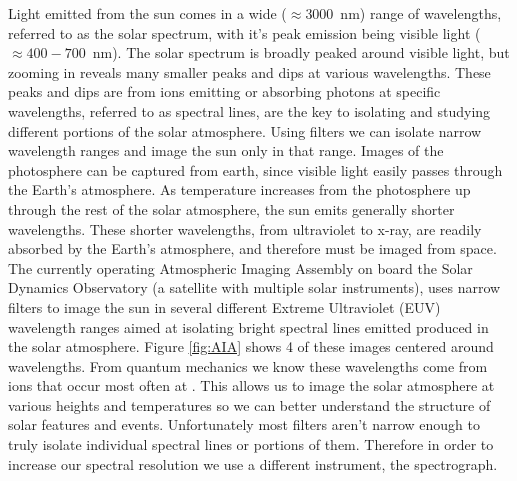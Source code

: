 Light emitted from the sun comes in a wide ($\approx3000$\, nm) range of wavelengths, referred to as the solar spectrum, with it's peak emission being visible light ($\approx400-700$\, nm). 
The solar spectrum is broadly peaked around visible light, but zooming in reveals many smaller peaks and dips at various wavelengths. 
These peaks and dips are from ions emitting or absorbing photons at specific wavelengths, referred to as spectral lines, are the key to isolating and studying different portions of the solar atmosphere.
Using filters we can isolate narrow wavelength ranges and image the sun only in that range.
Images of the photosphere can be captured from earth, since visible light easily passes through the Earth's atmosphere.
As temperature increases from the photosphere up through the rest of the solar atmosphere, the sun emits generally shorter wavelengths. 
These shorter wavelengths, from ultraviolet to x-ray, are readily absorbed by the Earth's atmosphere, and therefore must be imaged from space. 
The currently operating Atmospheric Imaging Assembly \citep[AIA:][]{} on board the Solar Dynamics Observatory (a satellite with multiple solar instruments), uses narrow filters to image the sun in several different Extreme Ultraviolet (EUV) wavelength ranges aimed at isolating bright spectral lines emitted produced in the solar atmosphere.
Figure \ref{fig:AIA} shows 4 of these images centered around  wavelengths.
From quantum mechanics we know these wavelengths come from  ions that occur most often at .
This allows us to image the solar atmosphere at various heights and temperatures so we can better understand the structure of solar features and events.
Unfortunately most filters aren't narrow enough to truly isolate individual spectral lines or portions of them.
Therefore in order to increase our spectral resolution we use a different instrument, the spectrograph.

